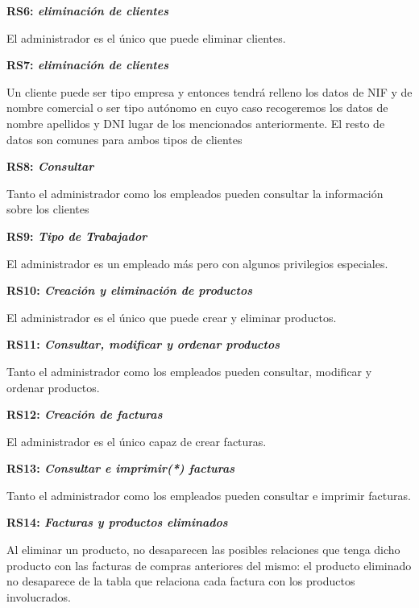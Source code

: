 \documentclass[paper=a4, fontsize=11pt, spanish]{scrartcl}
\begin{document}
\setlength{\parindent}{0em}
\textbf{RS6: \textit{eliminación de clientes}}
\setlength{\parindent}{2em}

El administrador es el único que puede eliminar clientes.

\setlength{\parindent}{0em}
\textbf{RS7: \textit{eliminación de clientes}}
\setlength{\parindent}{2em}

Un cliente puede ser tipo empresa y entonces tendrá relleno los datos de NIF y de nombre comercial o ser tipo autónomo en cuyo caso recogeremos los datos de nombre apellidos y DNI lugar de los mencionados anteriormente. El resto de datos son comunes para ambos tipos de clientes

\setlength{\parindent}{0em}
\textbf{RS8: \textit{Consultar}}
\setlength{\parindent}{2em}

Tanto el administrador como los empleados pueden consultar la información sobre los clientes


\setlength{\parindent}{0em}
\textbf{RS9: \textit{Tipo de Trabajador}}
\setlength{\parindent}{2em}

El administrador es un empleado más pero con algunos privilegios especiales.

\setlength{\parindent}{0em}
\textbf{RS10: \textit{Creación y eliminación de productos}}
\setlength{\parindent}{2em}

El administrador es el único que puede crear y eliminar productos.

\setlength{\parindent}{0em}
\textbf{RS11: \textit{Consultar, modificar y ordenar productos}}
\setlength{\parindent}{2em}

Tanto el administrador como los empleados pueden consultar, modificar y ordenar productos.

\setlength{\parindent}{0em}
\textbf{RS12: \textit{Creación de facturas}}
\setlength{\parindent}{2em}

El administrador es el único capaz de crear facturas.

\setlength{\parindent}{0em}
\textbf{RS13: \textit{Consultar e imprimir(*) facturas}}
\setlength{\parindent}{2em}

Tanto el administrador como los empleados pueden consultar e imprimir facturas.

\setlength{\parindent}{0em}
\textbf{RS14: \textit{Facturas y productos eliminados}}
\setlength{\parindent}{2em}

Al eliminar un producto, no desaparecen las posibles relaciones que tenga dicho producto con las facturas de compras anteriores del mismo: el producto eliminado no desaparece de la tabla que relaciona cada factura con los productos involucrados.
\end{document}

